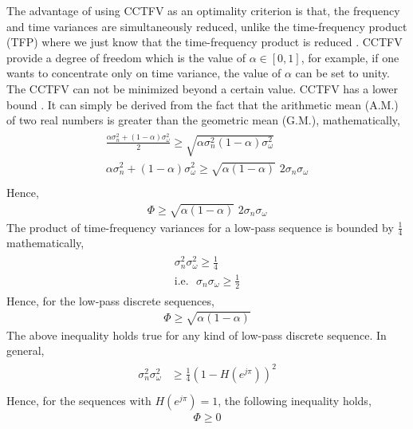 The advantage of using CCTFV as an optimality criterion is that, the frequency and time variances are simultaneously reduced, unlike the time-frequency product (TFP) where we just know that the time-frequency product is reduced \cite{CSSP}. CCTFV provide a degree of freedom which is the value of $\alpha \in [0,1]$, for example, if one wants to concentrate only on time variance, the value of $\alpha$ can be set to unity. The CCTFV can not be minimized beyond a certain value. CCTFV has a lower bound \cite{CSSP}. It can simply be derived from the fact that the arithmetic mean (A.M.) of two real numbers is greater than the geometric mean (G.M.), mathematically,
\begin{eqnarray}
\begin{aligned}
\frac{\alpha  \sigma_n^2 + (1-\alpha) \sigma_\omega^2}{2} \geq \sqrt{\alpha  \sigma_n^2 (1-\alpha)\sigma_\omega^2}\\
\alpha  \sigma_n^2 + (1-\alpha) \sigma_\omega^2 \geq \sqrt{\alpha(1-\alpha)}\,\,2\sigma_n \sigma_\omega\\
\end{aligned}
\end{eqnarray}
Hence,
\begin{eqnarray}
\Phi \geq \sqrt{\alpha(1-\alpha)}\,\,2 \sigma_n \sigma_\omega
\end{eqnarray}
The product of time-frequency variances for a low-pass sequence is bounded by $\frac{1}{4}$ \cite{key-11,key-36} mathematically,
\begin{eqnarray}
\begin{aligned}
\sigma_n^2 \sigma_\omega^2 \geq \frac{1}{4}\\
\text{i.e.} \,\,\,\, \sigma_n \sigma_\omega \geq \frac{1}{2}
\end{aligned}
\end{eqnarray}
Hence, for the low-pass discrete sequences,
\begin{eqnarray}
\label{eq: CCTFV Bound LP}
\Phi \geq \sqrt{\alpha(1-\alpha)}
\end{eqnarray}
The above inequality holds true for any kind of low-pass discrete sequence. In general,
\begin{eqnarray}
\begin{aligned}
\sigma_n^2 \sigma_\omega^2 &\geq \frac{1}{4} (1 - H(e^{j\pi}))^2 \\
\end{aligned}
\end{eqnarray}
Hence, for the sequences with $H(e^{j\pi}) = 1$, the following inequality holds,
\begin{eqnarray}
\label{eq: CCTFV Bound HP}
\Phi \geq 0
\end{eqnarray}
